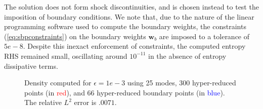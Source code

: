 \documentclass[preprint,10pt]{elsarticle}
\theoremstyle{definition}
\theoremstyle{lemma}
\theoremstyle{theorem}
\theoremstyle{assumption}
\begin{document}
The solution does not form shock discontinuities, and is chosen instead to test the imposition of boundary conditions.  We note that, due to the nature of the linear programming software used to compute the boundary weights, the constraints (\ref{eq:sbpconstraints}) on the boundary weights $\bm{w}_b$ are imposed to a tolerance of $5e-8$.  Despite this inexact enforcement of constraints, the computed entropy RHS remained small, oscillating around $10^{-11}$ in the absence of entropy dissipative terms.  

\begin{figure}
\centering
\hspace{.1em}
\hspace{.1em}
\caption{Density computed for $\epsilon = 1e-3$ using 25 modes, 300 hyper-reduced points (in \textcolor{red}{red}), and 66 hyper-reduced boundary points (in \textcolor{blue}{blue}).  The relative $L^2$ error is $.0071$.}
\label{fig:pulse2d}
\end{figure}
\end{document}
